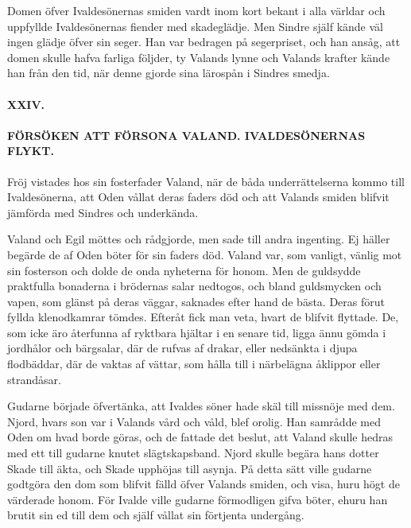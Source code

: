 Domen öfver Ivaldesönernas smiden vardt inom kort bekant i alla världar
och uppfyllde Ivaldesönernas fiender med skadeglädje. Men Sindre själf
kände väl ingen glädje öfver sin seger. Han var bedragen på segerpriset,
och han ansåg, att domen skulle hafva farliga följder, ty Valands lynne
och Valands krafter kände han från den tid, när denne gjorde sina
lärospån i Sindres smedja.

\paragraph{XXIV.}

\paragraph{FÖRSÖKEN ATT FÖRSONA VALAND. IVALDESÖNERNAS FLYKT.}

Fröj vistades hos sin fosterfader Valand, när de båda underrättelserna
kommo till Ivaldesönerna, att Oden vållat deras faders död och att
Valands smiden blifvit jämförda med Sindres och underkända.

Valand och Egil möttes och rådgjorde, men sade till andra ingenting. Ej
häller begärde de af Oden böter för sin faders död. Valand var, som
vanligt, vänlig mot sin fosterson och dolde de onda nyheterna för honom.
Men de guldsydde praktfulla bonaderna i brödernas salar nedtogos, och
bland guldsmycken och vapen, som glänst på deras väggar, saknades efter
hand de bästa. Deras förut fyllda klenodkamrar tömdes. Efteråt fick man
veta, hvart de blifvit flyttade. De, som icke äro återfunna af ryktbara
hjältar i en senare tid, ligga ännu gömda i jordhålor och bärgsalar, där
de rufvas af drakar, eller nedsänkta i djupa flodbäddar, där de vaktas
af vättar, som hålla till i närbelägna åklippor eller strandåsar.

Gudarne började öfvertänka, att Ivaldes söner hade skäl till missnöje
med dem. Njord, hvars son var i Valands vård och våld, blef orolig. Han
samrådde med Oden om hvad borde göras, och de fattade det beslut, att
Valand skulle hedras
\protect\hypertarget{lb1625905.xhtmlux5cux23start75}{}{}\protect\hypertarget{lb1625905.xhtmlux5cux23start75-a}{}{}\protect\hypertarget{lb1625905.xhtmlux5cux23start75-b}{}{}\protect\hypertarget{lb1625905.xhtmlux5cux23start75-c}{}{}\protect\hypertarget{lb1625905.xhtmlux5cux23start75-d}{}{}
med ett till gudarne knutet slägtskapsband. Njord skulle begära hans
dotter Skade till äkta, och Skade upphöjas till asynja. På detta sätt
ville gudarne godtgöra den dom som blifvit fälld öfver Valands smiden,
och visa, huru högt de värderade honom. För Ivalde ville gudarne
förmodligen gifva böter, ehuru han brutit sin ed till dem och själf
vållat sin förtjenta undergång.

